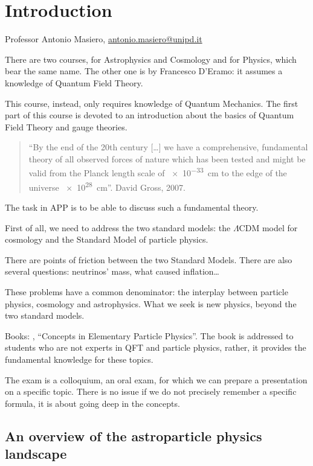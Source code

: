 \documentclass[main.tex]{subfiles}
\begin{document}

\section*{Introduction}

Professor Antonio Masiero, \url{antonio.masiero@unipd.it}

There are two courses, for Astrophysics and Cosmology and for Physics, which bear the same name. 
The other one is by Francesco D'Eramo: it assumes a knowledge of Quantum Field Theory.

This course, instead, only requires knowledge of Quantum Mechanics. 
The first part of this course is devoted to an introduction about the basics of Quantum Field Theory and gauge theories.


\begin{quotation}
  ``By the end of the 20th century [\dots] we have a comprehensive, fundamental theory of all observed forces of nature which has been tested and might be valid from the Planck length scale of \SI{e-33}{cm} to the edge of the universe \SI{e28}{cm}''. David Gross, 2007. 
\end{quotation}

The task in APP is to be able to discuss such a fundamental theory. 

First of all, we need to address the two standard models: the \(\Lambda \)CDM model for cosmology and the Standard Model of particle physics.

There are points of friction between the two Standard Models.
There are also several questions: neutrinos' mass, what caused inflation\dots 

These problems have a common denominator: the interplay between particle physics, cosmology and astrophysics.
What we seek is new physics, beyond the two standard models. 

Books: \textcite[]{peskinConceptsElementaryParticle2019}, ``Concepts in Elementary Particle Physics''. The book is addressed to students who are not experts in QFT and particle physics, rather, it provides the fundamental knowledge for these topics.

The exam is a colloquium, an oral exam, for which we can prepare a presentation on a specific topic. 
There is no issue if we do not precisely remember a specific formula, it is about going deep in the concepts.

\subsection*{An overview of the astroparticle physics landscape}
\end{document}
